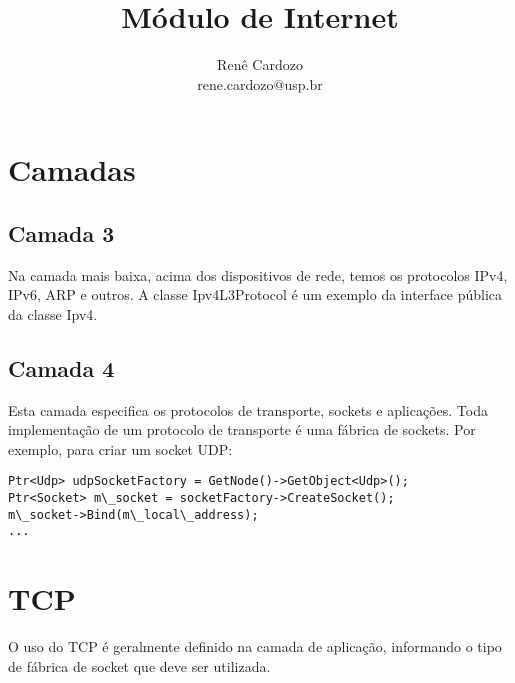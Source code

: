 \documentclass{article}
\author{Renê Cardozo \\ 
        rene.cardozo@usp.br}
\title{Módulo de Internet}
\date{}
\begin{document}
\maketitle

\section{Camadas}

\subsection{Camada 3}
Na camada mais baixa, acima dos dispositivos de rede, temos os protocolos IPv4, IPv6, ARP e outros. A classe
Ipv4L3Protocol é um exemplo da interface pública da classe Ipv4.

\subsection{Camada 4}

Esta camada especifica os protocolos de transporte, sockets e aplicações. Toda implementação de um protocolo de
transporte é uma fábrica de sockets. Por exemplo, para criar um socket UDP:

\begin{lstlisting}
Ptr<Udp> udpSocketFactory = GetNode()->GetObject<Udp>();
Ptr<Socket> m\_socket = socketFactory->CreateSocket();
m\_socket->Bind(m\_local\_address);
...
\end{lstlisting}

\section{TCP}
O uso do TCP é geralmente definido na camada de aplicação, informando o tipo de fábrica de socket que deve ser
utilizada.
\end{document}
